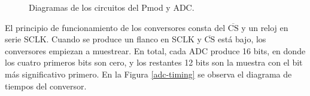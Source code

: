 \begin{figure}[hbt!]
    \centering
    \hspace{10mm}
    \caption{Diagramas de los circuitos del Pmod y ADC.}
    \label{diagramas-adc}
\end{figure}

El principio de funcionamiento de los conversores consta del $\overline{\mbox{CS}}$ y un reloj en serie SCLK. Cuando se produce un flanco en SCLK y $\overline{\mbox{CS}}$ está bajo, los conversores empiezan a muestrear. En total, cada ADC produce 16 bits, en donde los cuatro primeros bits son cero, y los restantes 12 bits son la muestra con el bit más significativo primero. En la Figura \ref{adc-timing} se observa el diagrama de tiempos del conversor.

